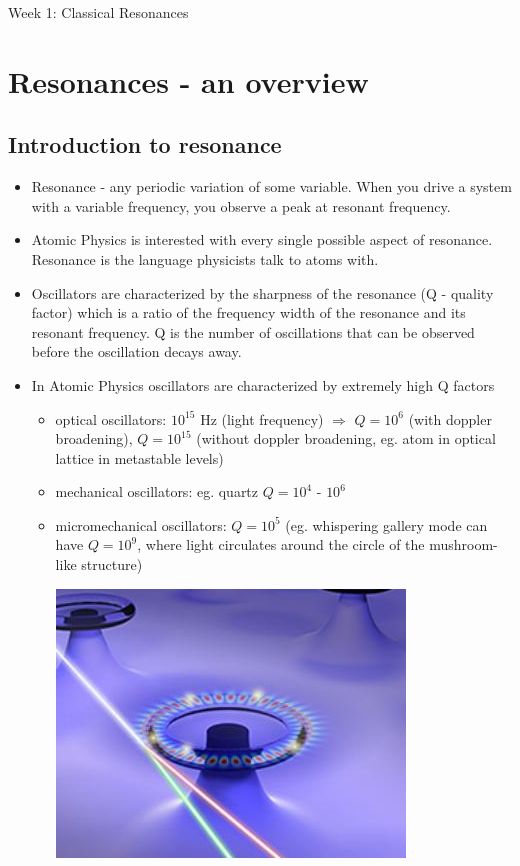 \documentclass[AtomicOptical1Notes.tex]{subfiles}
\begin{document}
\begin{center}\huge Week 1: Classical Resonances\end{center}

\section{Resonances - an overview}

	\subsection{Introduction to resonance}
				\begin{itemize}
					\item Resonance - any periodic variation of some variable. When you drive a system with a variable frequency, you observe a peak at resonant frequency.
					\item Atomic Physics is interested with every single possible aspect of resonance. Resonance is the language physicists talk to atoms with.
					\item Oscillators are characterized by the sharpness of the resonance (Q - quality factor) which is a ratio of the frequency width of the resonance and its resonant frequency. Q is the number of oscillations that can be observed before the oscillation decays away.
					\item In Atomic Physics oscillators are characterized by extremely high Q factors
						\begin{itemize}
							\item optical oscillators: $10^{15}$ Hz (light frequency) $\Rightarrow$ $Q = 10^6$	(with doppler broadening), $Q = 10^{15}$ (without doppler broadening, eg. atom in optical lattice in metastable levels)
							\item mechanical oscillators: eg. quartz $Q = 10^4$ - $10^6$
							\item micromechanical oscillators: $Q = 10^5$ (eg. whispering gallery mode can have $Q = 10^9$, where light circulates around the circle of the mushroom-like structure)
							
							\includegraphics{whispering}
							

\end{itemize}
\end{itemize}
\end{document}
